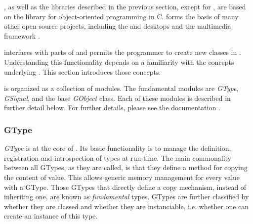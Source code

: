 \documentclass[article]{jss}
\begin{document}
, as well as the libraries described in the previous
section,
except for , are based on the  library for 
object-oriented programming in C.  forms the basis of
many other 
open-source projects, including the  \citep{GTK} and
\citep{xfce} desktops and the  multimedia framework
\citep{gstreamer}.

 interfaces with parts of  and permits the
programmer to create new  classes in .
Understanding 
this functionality depends on a familiarity with the concepts
underlying 
. This section introduces those concepts.

 is organized as a collection of modules. The fundamental
modules are \emph{GType}, \emph{GSignal}, and the base
\emph{GObject} class. Each of these modules is described in further
detail below. 
For further details, please see the  documentation
\citep{gobject}.

\subsubsection{GType}
%



\emph{GType} is at the core of . Its basic functionality
is to manage the definition, registration and introspection of types
at run-time. The main commonality between all GTypes, as they are
called, is that they define a method for copying the content of  value. This allows generic memory management for every value with a
GType. Those GTypes that directly define a copy mechanism, instead of
inheriting one, are known as \emph{fundamental} types.  GTypes are
further classified by whether they are classed and whether they are
instanciable, i.e. whether one can create an instance of this type.
\end{document}
